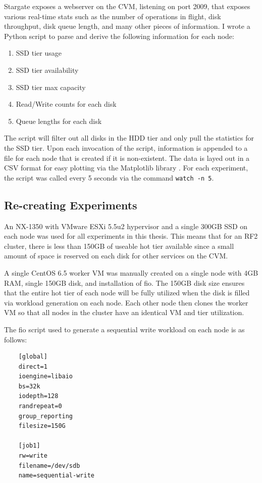 \documentclass[12pt]{article}
\begin{document}
  Stargate exposes a webserver on the CVM, listening on port 2009, that exposes
  various real-time stats such as the number of operations in flight, disk
  throughput, disk queue length, and many other pieces of information. I wrote
  a Python script to parse and derive the following information for each node:

  \begin{enumerate}
    \item SSD tier usage
    \item SSD tier availability
    \item SSD tier max capacity
    \item Read/Write counts for each disk
    \item Queue lengths for each disk
  \end{enumerate}

  The script will filter out all disks in the HDD tier and only pull the
  statistics for the SSD tier. Upon each invocation of the script, information
  is appended to a file for each node that is created if it is non-existent.
  The data is layed out in a CSV format for easy plotting via the Matplotlib
  library \cite{matplotlib}. For each experiment, the script was called every 5
  seconds via the command \verb|watch -n 5|.

  \subsection{Re-creating Experiments}

  An NX-1350 with VMware ESXi 5.5u2 hypervisor and a single 300GB SSD on each
  node was used for all experiments in this thesis. This means that for an RF2
  cluster, there is less than 150GB of useable hot tier available since a small
  amount of space is reserved on each disk for other services on the CVM.

  A single CentOS 6.5 worker VM was manually created on a single node with 4GB
  RAM, single 150GB disk, and installation of fio. The 150GB disk size ensures
  that the entire hot tier of each node will be fully utilized when the disk is
  filled via workload generation on each node. Each other node then clones the
  worker VM so that all nodes in the cluster have an identical VM and tier
  utilization.

  The fio script used to generate a sequential write workload on each node is
  as follows:
  
  \singlespace
  \begin{tcolorbox}
  \begin{verbatim}
    [global]
    direct=1
    ioengine=libaio
    bs=32k
    iodepth=128
    randrepeat=0
    group_reporting
    filesize=150G

    [job1]
    rw=write
    filename=/dev/sdb
    name=sequential-write
  \end{verbatim}
  \end{tcolorbox}
  \doublespace
\end{document}
